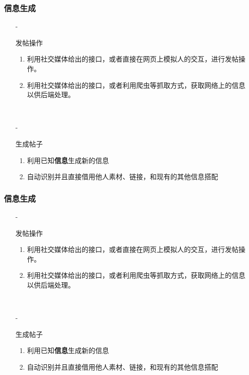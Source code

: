 \documentclass[../Postbot.tex]{subfiles}
\begin{document}
	\begin{frame}
		\frametitle{信息生成}
		\begin{itemize}
			\item[-]{
				发帖操作
				\begin{enumerate}
					\item 利用社交媒体给出的接口，或者直接在网页上模拟人的交互，进行发帖操作。
					\item 利用社交媒体给出的接口，或者利用爬虫等抓取方式，获取网络上的信息以供后端处理。
				\end{enumerate}
				\hspace*{\fill}\\
				}
			\item[-]{
				生成帖子
				\begin{enumerate}
					\item 利用已知\textbf{信息}生成新的信息
					\item 自动识别并且直接借用他人素材、链接，和现有的其他信息搭配
				\end{enumerate}
				} 
		\end{itemize}
	\end{frame}

	\begin{frame}
		\frametitle{信息生成}
		\begin{itemize}
			\item[-]{
				发帖操作
				\begin{enumerate}
					\item 利用社交媒体给出的接口，或者直接在网页上模拟人的交互，进行发帖操作。
					\item 利用社交媒体给出的接口，或者利用爬虫等抓取方式，获取网络上的信息以供后端处理。
				\end{enumerate}
				\hspace*{\fill}\\
				}
			\item[-]{
				生成帖子
				\begin{enumerate}
					\item 利用已知\textbf{信息}生成新的信息
					\item 自动识别并且直接借用他人素材、链接，和现有的其他信息搭配
				\end{enumerate}
				} 
		\end{itemize}
	\end{frame}
\end{document}

